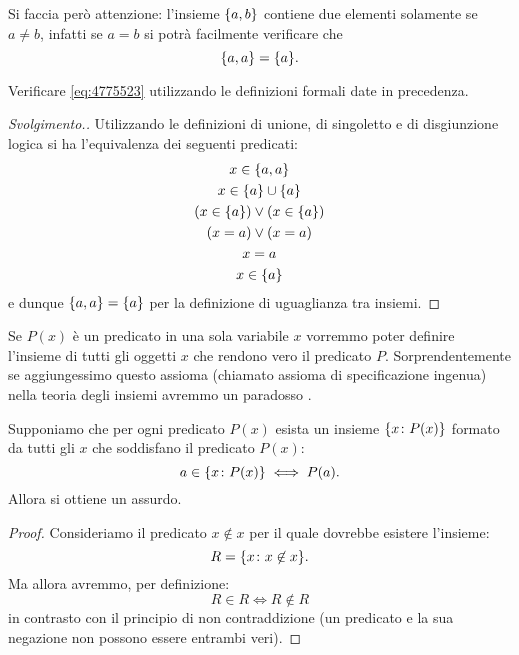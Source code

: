 Si faccia però attenzione: l'insieme ${\left\{ a,b \right\}}$ contiene due elementi
solamente se $a\neq b$, infatti se $a=b$ si potrà facilmente verificare
che
\begin{equation}\label{eq:4775523}
{\left\{ a,a \right\}} = {\left\{ a \right\}}.
\end{equation}

\begin{exercise}
  Verificare \eqref{eq:4775523} utilizzando le definizioni formali date in precedenza.
\end{exercise}
\begin{proof}[Svolgimento.]
Utilizzando le definizioni di unione, di singoletto e di disgiunzione logica
si ha l'equivalenza dei seguenti
predicati:
\begin{gather*}
  x \in {\left\{ a,a \right\}}  \\
  x \in {\left\{ a \right\}} \cup {\left\{ a \right\}}\\
  (x \in {\left\{ a \right\}}) \lor (x \in {\left\{ a \right\}})\\
  (x = a) \lor (x = a) \\
  x = a \\
  x \in {\left\{ a \right\}}
\end{gather*}
e dunque ${\left\{ a,a \right\}}={\left\{ a \right\}}$ per la definizione di uguaglianza tra insiemi.
\end{proof}

Se $P(x)$ è un predicato in una sola variabile $x$ vorremmo poter
definire l'insieme di tutti gli oggetti $x$ 
che rendono vero il predicato $P$.
Sorprendentemente se aggiungessimo questo assioma 
(chiamato assioma di specificazione ingenua) nella teoria degli insiemi
avremmo un paradosso%
%
%
%
%
%
.

\begin{theorem}
\label{th:Russell}%
Supponiamo che per ogni predicato $P(x)$ esista un insieme 
${\left\{ x\colon P(x) \right\}}$ formato da tutti gli $x$ 
che soddisfano il predicato $P(x)$:
\[
  a \in {\left\{ x\colon P(x) \right\}} \iff P(a).
\]
Allora si ottiene un assurdo.
\end{theorem}
%
\begin{proof}
  Consideriamo il predicato $x \not \in x$
  per il quale dovrebbe esistere l'insieme:
  \[
    R = {\left\{ x\colon x\not \in x \right\}}.  
  \]
  Ma allora avremmo, per definizione:
  \[
    R \in R 
    \iff R\not \in R
  \]
  in contrasto con il principio di non contraddizione
  (un predicato e la sua negazione non possono essere entrambi veri).
\end{proof}

